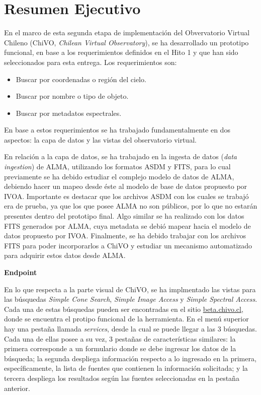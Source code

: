 \section{Resumen Ejecutivo}

En el marco de esta segunda etapa de implementación del Obvervatorio
Virtual Chileno (ChiVO, \emph{Chilean Virtual Observatory}), se ha
desarrollado un prototipo funcional, en base a los requerimientos
definidos en el Hito 1 y que han sido seleccionados para esta entrega.
Los requerimientos son:

\begin{itemize}
  \item Buscar por coordenadas o región del cielo.
  \item Buscar por nombre o tipo de objeto.
  \item Buscar por metadatos espectrales.
\end{itemize}

En base a estos requerimientos se ha trabajado fundamentalmente en dos
aspectos: la capa de datos y las vistas del observatorio virtual.

En relación a la capa de datos, se ha trabajado en la ingesta de datos
(\emph{data ingestion}) de ALMA, utilizando los formatos ASDM y FITS,
para lo cual previamente se ha debido estudiar el complejo modelo de
datos de ALMA, debiendo hacer un mapeo desde éste al modelo de base de
datos propuesto por IVOA. Importante es destacar que los archivos ASDM
con los cuales se trabajó era de prueba, ya que los que posee ALMA no
son públicos, por lo que no estarán presentes dentro del prototipo
final. Algo similar se ha realizado con los datos FITS generados por
ALMA, cuya metadata se debió mapear hacia el modelo de datos propuesto
por IVOA. Finalmente, se ha debido trabajar con los archivos FITS para
poder incorporarlos a ChiVO y estudiar un mecanismo automatizado para
adquirir estos datos desde ALMA.

\textbf{Endpoint}

En lo que respecta a la parte visual de ChiVO, se ha implmentado las
vistas para las búsquedas \emph{Simple Cone Search}, \emph{Simple
  Image Access} y \emph{Simple Spectral Access}. Cada una de estas
búsquedas pueden ser encontradas en el sitio \url{beta.chivo.cl},
donde se encuentra el protipo funcional de la herramienta. En el menú
superior hay una pestaña llamada \emph{services}, desde la cual se
puede llegar a las 3 búsquedas. Cada una de ellas posee a su vez, 3
pestañas de características similares: la primera corresponde a un
formulario donde se debe ingresar los datos de la búsqueda; la segunda
despliega información respecto a lo ingresado en la primera,
específicamente, la lista de fuentes que contienen la información
solicitada; y la tercera despliega los resultados según las fuentes
seleccionadas en la pestaña anterior.